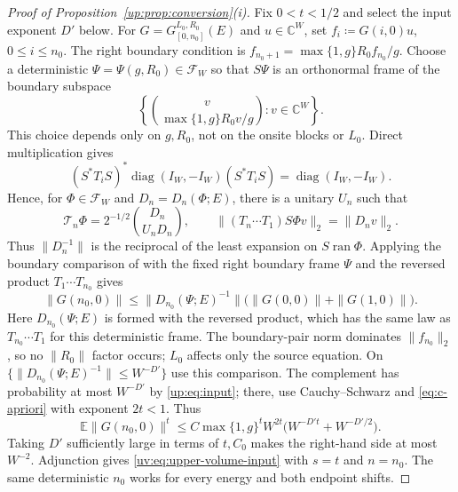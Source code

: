 \documentclass[11pt]{article}
\numberwithin{equation}{section}
\theoremstyle{remark}
\newcommand{\E}{\mathbb E}
\newcommand{\C}{\mathbb C}
\newcommand{\diag}{\operatorname{diag}}
\newcommand{\ran}{\operatorname{ran}}
\begin{document}
\begin{proof}[Proof of Proposition~\ref{up:prop:conversion}\textup{(i)}]
Fix $0<t<1/2$ and select the input exponent $D'$ below.
For $G=G_{[0,n_0]}^{L_0,R_0}(E)$ and $u\in\C^W$, set
$f_i\coloneqq G(i,0)u$, $0\le i\le n_0$. The right boundary condition is
$f_{n_0+1}=\max\{1,g\}R_0f_{n_0}/g$. Choose a deterministic
$\Psi=\Psi(g,R_0)\in\mathcal F_W$ so that $S\Psi$ is an orthonormal
frame of the boundary subspace
\[
 \left\{\binom{v}{\max\{1,g\}R_0v/g}:v\in\C^W\right\}.
\]
This choice depends only on $g,R_0$, not on the onsite blocks or $L_0$.
Direct multiplication gives
\[
 (S^*T_iS)^*\diag(I_W,-I_W)(S^*T_iS)=\diag(I_W,-I_W).
\]
Hence, for $\Phi\in\mathcal F_W$ and $D_n=D_n(\Phi;E)$,
there is a unitary $U_n$ such that
\begin{equation}\label{eq:c-D}
 \mathcal T_n\Phi
 =2^{-1/2}\binom{D_n}{U_nD_n},\qquad
 \|(T_n\cdots T_1)S\Phi v\|_2=\|D_nv\|_2.
\end{equation}
Thus $\|D_n^{-1}\|$ is the reciprocal of the least expansion on
$S\ran\Phi$. Applying the boundary comparison of
\cite[Claim~2.2(1) and proof of Claim~2.4]{MS} with the fixed right
boundary frame $\Psi$ and the reversed product $T_1\cdots T_{n_0}$ gives
\begin{equation}\label{eq:c-boundary-comparison}
 \|G(n_0,0)\|
 \le\|D_{n_0}(\Psi;E)^{-1}\|
       \bigl(\|G(0,0)\|+\|G(1,0)\|\bigr).
\end{equation}
Here $D_{n_0}(\Psi;E)$ is formed with the reversed product,
which has the same law as $T_{n_0}\cdots T_1$ for this deterministic frame.
The boundary-pair norm dominates $\|f_{n_0}\|_2$, so no $\|R_0\|$
factor occurs; $L_0$ affects only the source equation.
On $\{\|D_{n_0}(\Psi;E)^{-1}\|\le W^{-D'}\}$ use this comparison.
The complement has probability at most $W^{-D'}$ by \eqref{up:eq:input};
there, use Cauchy--Schwarz and \eqref{eq:c-apriori} with exponent
$2t<1$. Thus
\[
 \E\|G(n_0,0)\|^t
 \le C\max\{1,g\}^tW^{2t}
          \bigl(W^{-D't}+W^{-D'/2}\bigr).
\]
Taking $D'$ sufficiently large in terms of $t,C_0$ makes the
right-hand side at most $W^{-2}$. Adjunction gives
\eqref{uv:eq:upper-volume-input} with $s=t$ and $n=n_0$.
The same deterministic $n_0$ works for every energy and both endpoint shifts.
\end{proof}
\end{document}
